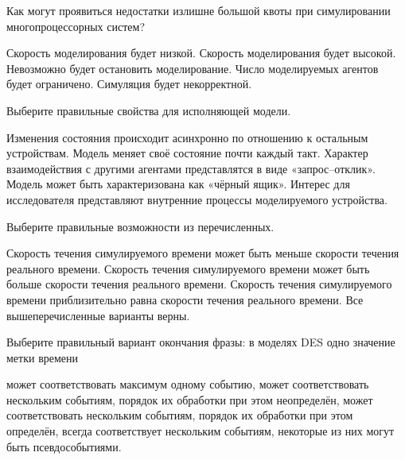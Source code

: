 \begin{questions}

\question[3] Как могут проявиться недостатки излишне большой квоты при симулировании многопроцессорных систем?
\begin{choices}
    \choice Скорость моделирования будет низкой.
    \choice Скорость моделирования будет высокой.
    \choice Невозможно будет остановить моделирование.
    \choice Число моделируемых агентов будет ограничено.
    \correctchoice Симуляция будет некорректной. %
\end{choices}

\question[3] Выберите правильные свойства для исполняющей модели.
\begin{choices}
    \choice Изменения состояния происходит асинхронно по отношению к остальным устройствам.
    \correctchoice Модель меняет своё состояние почти каждый такт.
    \choice Характер взаимодействия с другими агентами представлятся в виде «запрос--отклик».
    \choice Модель может быть характеризована как «чёрный ящик».
    \correctchoice Интерес для исследователя представляют внутренние процессы моделируемого устройства.
\end{choices}

\question[3] Выберите правильные возможности из перечисленных.
\begin{choices}
    \choice Скорость течения симулируемого времени может быть меньше скорости течения реального времени.
    \choice Скорость течения симулируемого времени может быть больше скорости течения реального времени.
    \choice Скорость течения симулируемого времени приблизительно равна скорости течения реального времени.
    \correctchoice Все вышеперечисленные варианты верны.
\end{choices}   

\question[3] Выберите правильный вариант окончания фразы: в моделях DES одно значение метки времени
\begin{choices}
    \choice может соответствовать максимум одному событию,
    \choice может соответствовать нескольким событиям, порядок их обработки при этом неопределён,
    \correctchoice может соответствовать нескольким событиям, порядок их обработки при этом определён,
    \choice всегда соответствует нескольким событиям, некоторые из них могут быть псевдособытиями.
\end{choices}


\end{questions}
